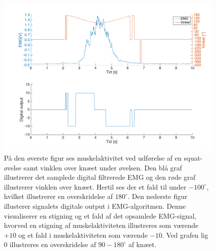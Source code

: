 \begin{figure}[H]
\centering
\includegraphics[width=1\textwidth]{figures/test_brugerinput}
\caption{På den øverste figur ses muskelaktivitet ved udførelse af en squat-øvelse samt vinklen over knæet under øvelsen. Den blå graf illustrerer det samplede digital filtrerede EMG og den røde graf illustrerer vinklen over knæet. Hertil ses der et fald til under $-100^{\circ}$, hvilket illustrerer en overskridelse af $180^{\circ}$. Den nederste figur illusterer signalets digitale output i EMG-algoritmen. Denne visualiserer en stigning og et fald af det opsamlede EMG-signal, hvorved en stigning af muskelaktiviteten illustreres som værende $+10$ og et fald i muskelaktiviteten som værende $-10$. Ved grafen lig 0 illustreres en overskridelse af $90-180^{\circ}$ af knæet.}
\label{fig:test_brugerinput}
\end{figure}

